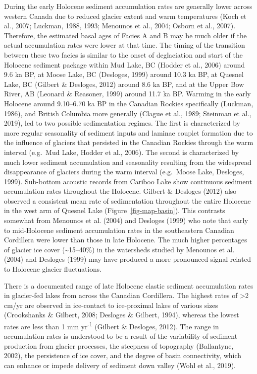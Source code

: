 \documentclass[
  letterpaper,
  DIV=11,
  numbers=noendperiod]{scrartcl}
\begin{document}
During the early Holocene sediment accumulation rates are generally
lower across western Canada due to reduced glacier extent and warm
temperatures (Koch et al., 2007; Luckman, 1988, 1993; Menounos et al.,
2004; Osborn et al., 2007). Therefore, the estimated basal ages of
Facies A and B may be much older if the actual accumulation rates were
lower at that time. The timing of the transition between these two
facies is similar to the onset of deglaciation and start of the Holocene
sediment package within Mud Lake, BC (Hodder et al., 2006) around 9.6 ka
BP, at Moose Lake, BC (Desloges, 1999) around 10.3 ka BP, at Quesnel
Lake, BC (Gilbert \& Desloges, 2012) around 8.6 ka BP, and at the Upper
Bow River, AB (Leonard \& Reasoner, 1999) around 11.7 ka BP. Warming in
the early Holocene around 9.10--6.70 ka BP in the Canadian Rockies
specifically (Luckman, 1986), and British Columbia more generally
(Clague et al., 1989; Steinman et al., 2019), led to two possible
sedimentation regimes. The first is characterized by more regular
seasonality of sediment inputs and laminae couplet formation due to the
influence of glaciers that persisted in the Canadian Rockies through the
warm interval (e.g.~Mud Lake, Hodder et al., 2006). The second is
characterized by much lower sediment accumulation and seasonality
resulting from the widespread disappearance of glaciers during the warm
interval (e.g.~Moose Lake, Desloges, 1999). Sub-bottom acoustic records
from Cariboo Lake show continuous sediment accumulation rates throughout
the Holocene. Gilbert \& Desloges (2012) also observed a consistent mean
rate of sedimentation throughout the entire Holocene in the west arm of
Quesnel Lake (Figure~\ref{fig-map-basin}). This contrasts somewhat from
Menounos et al. (2004) and Desloges (1999) who note that early to
mid-Holocene sediment accumulation rates in the southeastern Canadian
Cordillera were lower than those in late Holocene. The much higher
percentages of glacier ice cover (\textasciitilde15--40\%) in the
watersheds studied by Menounos et al. (2004) and Desloges (1999) may
have produced a more pronounced signal related to Holocene glacier
fluctuations.

There is a documented range of late Holocene clastic sediment
accumulation rates in glacier-fed lakes from across the Canadian
Cordillera. The highest rates of \textgreater2 cm/yr are observed in
ice-contact to ice-proximal lakes of various sizes (Crookshanks \&
Gilbert, 2008; Desloges \& Gilbert, 1994), whereas the lowest rates are
less than 1 mm yr\textsuperscript{-1} (Gilbert \& Desloges, 2012). The
range in accumulation rates is understood to be a result of the
variability of sediment production from glacier processes, the steepness
of topography (Ballantyne, 2002), the persistence of ice cover, and the
degree of basin connectivity, which can enhance or impede delivery of
sediment down valley (Wohl et al., 2019).
\end{document}
